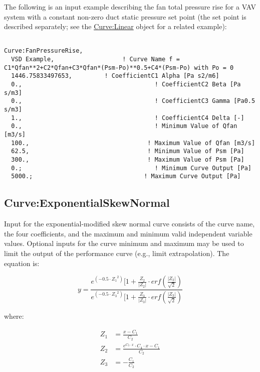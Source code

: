 The following is an input example describing the fan total pressure rise for a VAV system with a constant non-zero duct static pressure set point (the set point is described separately; see the \hyperref[curvelinear]{Curve:Linear} object for a related example):

\begin{lstlisting}

Curve:FanPressureRise,
  VSD Example,                   ! Curve Name f = C1*Qfan**2+C2*Qfan+C3*Qfan*(Psm-Po)**0.5+C4*(Psm-Po) with Po = 0
  1446.75833497653,         ! CoefficientC1 Alpha [Pa s2/m6]
  0.,                                     ! CoefficientC2 Beta [Pa s/m3]
  0.,                                     ! CoefficientC3 Gamma [Pa0.5 s/m3]
  1.,                                     ! CoefficientC4 Delta [-]
  0.,                                     ! Minimum Value of Qfan [m3/s]
  100.,                                 ! Maximum Value of Qfan [m3/s]
  62.5,                                 ! Minimum Value of Psm [Pa]
  300.,                                 ! Maximum Value of Psm [Pa]
  0.;                                     ! Minimum Curve Output [Pa]
  5000.;                               ! Maximum Curve Output [Pa]
\end{lstlisting}

\subsection{Curve:ExponentialSkewNormal}\label{curveexponentialskewnormal}

Input for the exponential-modified skew normal curve consists of the curve name, the four coefficients, and the maximum and minimum valid independent variable values. Optional inputs for the curve minimum and maximum may be used to limit the output of the performance curve (e.g., limit extrapolation). The equation is:

\begin{equation}
    y = \frac{{{e^{( - 0.5 \cdot {Z_1}^2)}}[1 + \frac{{{Z_2}}}{{\left| {{Z_2}} \right|}} \cdot erf\left( {\frac{{\left| {{Z_2}} \right|}}{{\sqrt 2 }}} \right)}}{{{e^{( - 0.5 \cdot {Z_3}^2)}}[1 + \frac{{{Z_3}}}{{\left| {{Z_3}} \right|}} \cdot erf\left( {\frac{{\left| {{Z_3}} \right|}}{{\sqrt 2 }}} \right)}}
\end{equation}

where:

\begin{align*}
  Z_1 &= \frac{x - C_1}{C_2} \\
  Z_2 &= \frac{e^{C_3 \cdot x} \cdot C_4 \cdot x - C_1}{C_2} \\
  Z_3 &= -\frac{C_1}{C_2}
\end{align*}

